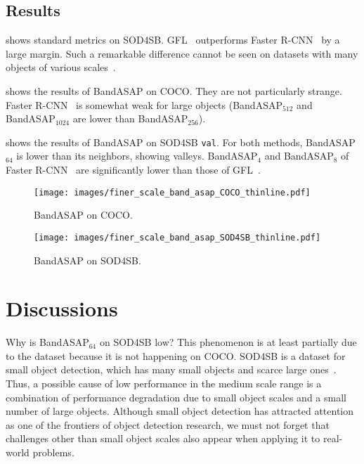 \documentclass{mva_style}
\begin{document}
\subsection{Results}

 shows standard metrics on SOD4SB.
GFL~\cite{GFL_NeurIPS2020} outperforms Faster R-CNN~\cite{Faster_R-CNN_NIPS2015} by a large margin.
Such a remarkable difference cannot be seen on datasets with many objects of various scales~\cite{USB_Shinya_BMVC2022}.

 shows the results of BandASAP on COCO.
They are not particularly strange.
Faster R-CNN~\cite{Faster_R-CNN_NIPS2015} is somewhat weak for large objects
(BandASAP$_{512}$ and BandASAP$_{1024}$ are lower than BandASAP$_{256}$).

 shows the results of BandASAP on SOD4SB \texttt{val}.
For both methods, BandASAP$_{64}$ is lower than its neighbors, showing valleys.
BandASAP$_{4}$ and BandASAP$_{8}$ of Faster R-CNN~\cite{Faster_R-CNN_NIPS2015} are significantly lower than those of GFL~\cite{GFL_NeurIPS2020}.


\begin{figure}[t]
	\centering
	\texttt{[image: images/finer\_scale\_band\_asap\_COCO\_thinline.pdf]}
	\vspace{-8mm}
	\caption{
		BandASAP on COCO.
	}
	\label{fig:band_asap_coco}
\end{figure}

\begin{figure}[t]
	\centering
	\texttt{[image: images/finer\_scale\_band\_asap\_SOD4SB\_thinline.pdf]}
	\vspace{-8mm}
	\caption{
		BandASAP on SOD4SB.
	}
	\label{fig:band_asap_sod4sb}
\end{figure}



\section{Discussions}
\label{sec:discussions}

Why is BandASAP$_{64}$ on SOD4SB low?
This phenomenon is at least partially due to the dataset because it is not happening on COCO.
SOD4SB is a dataset for small object detection, which has many small objects and scarce large ones~\cite{SOD4SB_MVA2023_challenge}.
Thus, a possible cause of low performance in the medium scale range is
a combination of performance degradation due to small object scales and a small number of large objects.
Although small object detection has attracted attention as one of the frontiers of object detection research,
we must not forget that challenges other than small object scales also appear when applying it to real-world problems.
\end{document}
